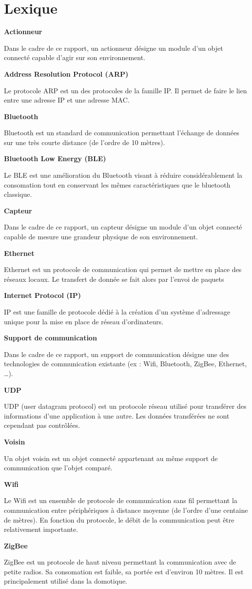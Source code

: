 \newcommand{\lexEntry}[2] {
	\noindent
	\parbox[t]{.3\textwidth}{\textbf{#1}}
	\hspace*{.03\textwidth}
	\parbox[t]{.65\textwidth}{#2}
	\hspace*{7pt}
}

\chapter*{Lexique}
	\lexEntry{Actionneur} {
		Dans le cadre de ce rapport, un actionneur désigne un module d'un objet connecté capable
		d'agir sur son environnement.
	}
	
	\lexEntry{Address Resolution Protocol (ARP)} {
		Le protocole ARP est un des protocoles de la famille IP. Il permet de faire le lien entre une
		adresse IP et une adresse MAC.
	}

	\lexEntry{Bluetooth} {
		Bluetooth est un standard de communication permettant l'échange de données sur une très
		courte distance (de l'ordre de 10 mètres).
	}
	
	\lexEntry{Bluetooth Low Energy (BLE)} {
		Le BLE est une amélioration du Bluetooth visant à réduire considérablement la consomation
		tout en conservant les mêmes caractéristiques que le bluetooth classique.
	}
	
	\lexEntry{Capteur} {
		Dans le cadre de ce rapport, un capteur désigne un module d'un objet connecté capable de
		mesure une grandeur physique de son environnement.
	}

	\lexEntry{Ethernet} {
		Ethernet est un protocole de communication qui permet de mettre en place
		des réseaux locaux. Le transfert de donnée se fait alors par l'envoi de
		paquets}
		
	\lexEntry{Internet Protocol (IP)} {
		IP est une famille de protocole dédié à la création d'un système d'adressage unique pour
		la mise en place de réseau d'ordinateurs.
	}
		
	\lexEntry{Support de communication} {
		Dans le cadre de ce rapport, un support de communication désigne une des technologies de
		communication existante (ex : Wifi, Bluetooth, ZigBee, Ethernet, \dots).
	}
	
	\lexEntry{UDP} {
		UDP (user datagram protocol) est un protocole réseau utilisé pour
		transférer des informations d'une application à une autre. Les données
		transférées ne sont cependant pas contrôlées.
	}
	
	\lexEntry{Voisin} {
		Un objet voisin est un objet connecté appartenant au même support de communication que
		l'objet comparé.
	}
		
	\lexEntry{Wifi} {
		Le Wifi est un ensemble de protocole de communication sans fil permettant la communication
		entre périphériques à distance moyenne (de l'ordre d'une centaine de mètres). En fonction
		du protocole, le débit de la communication peut être relativement importante.
	}
		
	\lexEntry{ZigBee} {
		ZigBee est un protocole de haut niveau permettant la communication avec de petite radios. 
		Sa consomation est faible, sa portée est d'environ 10 mètres. Il est principalement utilisé
		dans la domotique.
	}